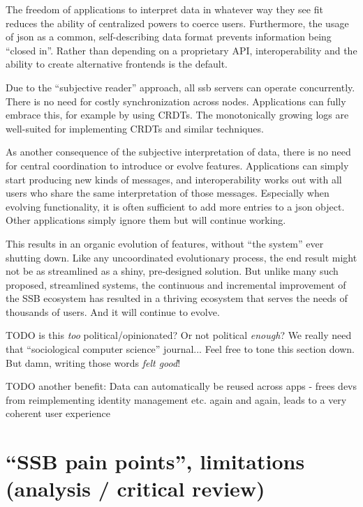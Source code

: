 \documentclass[sigconf]{acmart}
\begin{document}
The freedom of applications to interpret data in whatever way they see fit reduces the ability of centralized powers to coerce users. Furthermore, the usage of json as a common, self-describing data format prevents information being ``closed in''. Rather than depending on a proprietary API, interoperability and the ability to create alternative frontends is the default.

Due to the ``subjective reader'' approach, all ssb servers can operate concurrently. There is no need for costly synchronization across nodes. Applications can fully embrace this, for example by using CRDTs. The monotonically growing logs are well-suited for implementing CRDTs and similar techniques.

As another consequence of the subjective interpretation of data, there is no need for central coordination to introduce or evolve features. Applications can simply start producing new kinds of messages, and interoperability works out with all users who share the same interpretation of those messages. Especially when evolving functionality, it is often sufficient to add more entries to a json object. Other applications simply ignore them but will continue working.

This results in an organic evolution of features, without ``the system'' ever shutting down. Like any uncoordinated evolutionary process, the end result might not be as streamlined as a shiny, pre-designed solution. But unlike many such proposed, streamlined systems, the continuous and incremental improvement of the SSB ecosystem has resulted in a thriving ecosystem that serves the needs of thousands of users. And it will continue to evolve.

TODO is this \textit{too} political/opinionated? Or not political \textit{enough}? We really need that ``sociological computer science'' journal... Feel free to tone this section down. But damn, writing those words \textit{felt good}!

TODO another benefit: Data can automatically be reused across apps - frees devs from reimplementing identity management etc. again and again, leads to a very coherent user experience


\section{``SSB pain points'', limitations (analysis / critical review)}
\end{document}
